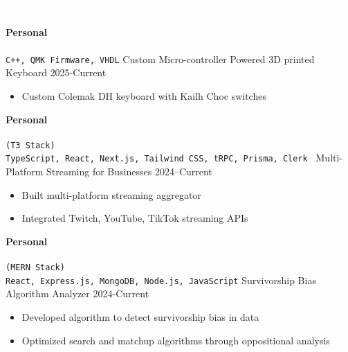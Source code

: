 \documentclass[9pt]{src/developercv} %
\begin{document}

	\colorbox{sky700}{\textcolor{white}{\LARGE\MakeUppercase{\textbf{Current Projects}}}}\\%
	\begin{entrylist}
		\entry
			{\textbf{Personal}\\\\\small{\texttt{C++, QMK Firmware, VHDL}}}
			{Custom Micro-controller Powered 3D printed Keyboard}
			{2025-Current}
			{
				\vspace{-1.0\baselineskip}
				\begin{itemize}
					\item Custom Colemak DH keyboard with Kailh Choc switches
				\end{itemize}
			}
		\entry
			{\textbf{Personal}\\\\\small{\texttt{(T3 Stack)\\TypeScript, React, Next.js, Tailwind CSS, tRPC, Prisma, Clerk }}}
			{Multi-Platform Streaming for Businesses}
			{2024--Current}
			{
				\vspace{-1.0\baselineskip}
				\begin{itemize}
					\item Built multi-platform streaming aggregator
					\item Integrated Twitch, YouTube, TikTok streaming APIs
				\end{itemize}
			}
		\entry
			{\textbf{Personal}\\\\\small{\texttt{(MERN Stack)\\React, Express.js, MongoDB, Node.js, JavaScript}}}
			{Survivorship Bias Algorithm Analyzer}
			{2024-Current}
			{
				\vspace{-1.0\baselineskip}
				\begin{itemize}
					\item Developed algorithm to detect survivorship bias in data
					\item Optimized search and matchup algorithms through oppositional analysis
				\end{itemize}
			}
	\end{entrylist}
\end{document}
